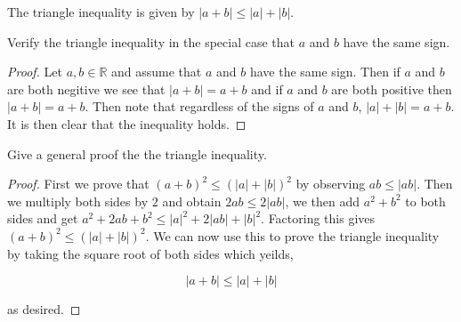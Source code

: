 \documentclass[11pt,largemargins]{homework}
\newcommand{\R}{\mathbb{R}}
\begin{document}
\question
The triangle inequality is given by $|a+b| \leq |a| + |b| $.
    \begin{alphaparts}
        \questionpart
            Verify the triangle inequality in the special case that $a$ and $b$ have the same sign. 
            
            \begin{proof}
                Let $a,b \in \R$ and assume that $a $ and $b$ have the same sign. Then if $a$ and $b$ are both negitive we see that $|a + b| = a + b$ and if $a$ and $b$ are both positive then $|a + b| = a + b$. Then note that regardless of the signs of $a$ and $b$, $|a| + |b| = a + b$.
                It is then clear that the inequality holds. 
            \end{proof}
        \questionpart
            Give a general proof the the triangle inequality. 

            \begin{proof}
                First we prove that $(a + b)^2 \leq (|a| + |b|)^2 $ by observing $ab \leq |ab| $. Then we multiply both sides by $2$ and obtain $2ab \leq 2|ab|$, we then add $a^2 + b^2$ to both sides and get $a^2 + 2ab + b^2 \leq |a|^2 + 2|ab| + |b|^2$. Factoring this gives 
                $(a + b)^2  \leq (|a| + |b|)^2$. We can now use this to prove the triangle inequality by taking the square root of both sides which yeilds, 

                \[
                    |a + b| \leq |a| + |b| 
                \]

                as desired. 
            
            \end{proof}

            
    \end{alphaparts}

\question
\end{document}
